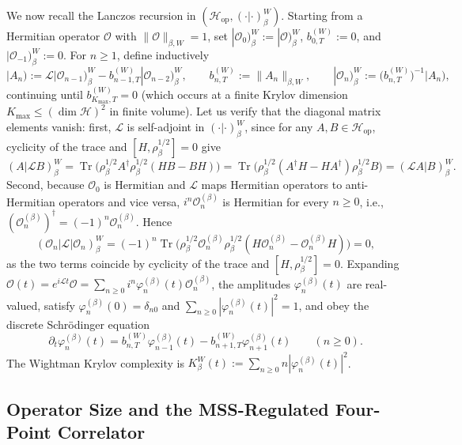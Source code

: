 \documentclass[11pt,a4paper]{article}
\numberwithin{equation}{section}
\theoremstyle{plain}
\theoremstyle{definition}
\newcommand{\Hop}{\mathcal{H}_{\mathrm{op}}}
\newcommand{\Tr}{\operatorname{Tr}}
\begin{document}
We now recall the Lanczos recursion in $(\Hop,(\cdot|\cdot)_\beta^W)$. Starting from a Hermitian operator $\mathcal{O}$ with $\|\mathcal{O}\|_{\beta,W}=1$, set $|\mathcal{O}_0)_\beta^W := |\mathcal{O})_\beta^W$, $b_{0,T}^{(W)} := 0$, and $|\mathcal{O}_{-1})_\beta^W := 0$. For $n\ge 1$, define inductively
\begin{equation}\label{eq:lanczos-rec}
  |A_n) := \mathcal{L}|\mathcal{O}_{n-1})_\beta^W - b_{n-1,T}^{(W)}|\mathcal{O}_{n-2})_\beta^W, \qquad
  b_{n,T}^{(W)} := \|A_n\|_{\beta,W}, \qquad
  |\mathcal{O}_n)_\beta^W := \bigl(b_{n,T}^{(W)}\bigr)^{-1}|A_n),
\end{equation}
continuing until $b_{K_{\max},T}^{(W)}=0$ (which occurs at a finite Krylov dimension $K_{\max}\le (\dim\mathcal{H})^2$ in finite volume). Let us verify that the diagonal matrix elements vanish: first, $\mathcal{L}$ is self-adjoint in $(\cdot|\cdot)_\beta^W$, since for any $A,B\in\Hop$, cyclicity of the trace and $[H,\rho_\beta^{1/2}]=0$ give
\[
  (A|\mathcal{L}B)_\beta^W = \Tr\!\bigl(\rho_\beta^{1/2} A^\dagger\rho_\beta^{1/2}(HB-BH)\bigr)
  = \Tr\!\bigl(\rho_\beta^{1/2}(A^\dagger H - H A^\dagger)\rho_\beta^{1/2}B\bigr)
  = (\mathcal{L}A|B)_\beta^W.
\]
Second, because $\mathcal{O}_0$ is Hermitian and $\mathcal{L}$ maps Hermitian operators to anti-Hermitian operators and vice versa, $i^n\mathcal{O}_n^{(\beta)}$ is Hermitian for every $n\ge 0$, i.e., $(\mathcal{O}_n^{(\beta)})^\dagger = (-1)^n \mathcal{O}_n^{(\beta)}$. Hence
\[
  (\mathcal{O}_n|\mathcal{L}|\mathcal{O}_n)_\beta^W
  = (-1)^n \Tr\!\bigl(\rho_\beta^{1/2}\mathcal{O}_n^{(\beta)}\rho_\beta^{1/2}(H\mathcal{O}_n^{(\beta)} - \mathcal{O}_n^{(\beta)}H)\bigr) = 0,
\]
as the two terms coincide by cyclicity of the trace and $[H,\rho_\beta^{1/2}]=0$. Expanding $\mathcal{O}(t) = e^{i\mathcal{L}t}\mathcal{O} = \sum_{n\ge 0} i^n\varphi_n^{(\beta)}(t)\mathcal{O}_n^{(\beta)}$, the amplitudes $\varphi_n^{(\beta)}(t)$ are real-valued, satisfy $\varphi_n^{(\beta)}(0)=\delta_{n0}$ and $\sum_{n\ge 0}|\varphi_n^{(\beta)}(t)|^2=1$, and obey the discrete Schr\"odinger equation
\begin{equation}\label{eq:krylov-ode}
  \partial_t\varphi_n^{(\beta)}(t) = b_{n,T}^{(W)}\varphi_{n-1}^{(\beta)}(t) - b_{n+1,T}^{(W)}\varphi_{n+1}^{(\beta)}(t) \qquad (n\ge 0).
\end{equation}
The Wightman Krylov complexity is $K_\beta^W(t) := \sum_{n\ge 0} n|\varphi_n^{(\beta)}(t)|^2$.

\subsection{Operator Size and the MSS-Regulated Four-Point Correlator}\label{subsec:size-mss}
\end{document}
